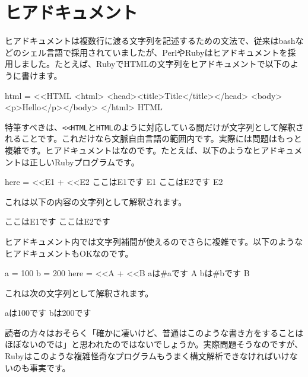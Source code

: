 \section{ヒアドキュメント}

ヒアドキュメントは複数行に渡る文字列を記述するための文法で、従来はbashなどのシェル言語で採用されていましたが、PerlやRubyはヒアドキュメントを採用しました。たとえば、RubyでHTMLの文字列をヒアドキュメントで以下のように書けます。

\begin{codescreen}{}
html = <<HTML
<html>
  <head><title>Title</title></head>
  <body><p>Hello</p></body>
</html>
HTML
\end{codescreen}

特筆すべきは、\texttt{\textless{}\textless{}HTML}と\texttt{HTML}のように対応している間だけが文字列として解釈されることです。これだけなら文脈自由言語の範囲内です。実際には問題はもっと複雑です。ヒアドキュメントはなのです。たとえば、以下のようなヒアドキュメントは正しいRubyプログラムです。

\begin{codescreen}{}
here = <<E1 + <<E2
ここはE1です
E1
ここはE2です
E2
\end{codescreen}

これは以下の内容の文字列として解釈されます。

\begin{codescreen}{}
ここはE1です
ここはE2です
\end{codescreen}

ヒアドキュメント内では文字列補間が使えるのでさらに複雑です。以下のようなヒアドキュメントもOKなのです。

\begin{codescreen}{}
a = 100
b = 200
here = <<A + <<B
aは#{a}です
A
bは#{b}です
B
\end{codescreen}

これは次の文字列として解釈されます。

\begin{codescreen}{}
aは100です
bは200です
\end{codescreen}

読者の方々はおそらく「確かに凄いけど、普通はこのような書き方をすることはほぼないのでは」と思われたのではないでしょうか。実際問題そうなのですが、Rubyはこのような複雑怪奇なプログラムもうまく構文解析できなければいけないのも事実です。

